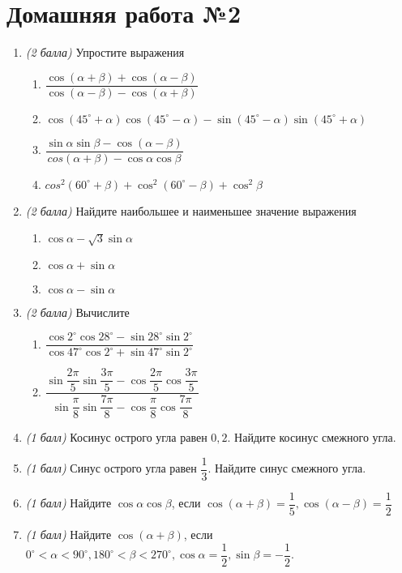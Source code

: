 \documentclass[12pt, a4paper]{article}
\begin{document}
	
	\section*{Домашняя работа №2}
	\begin{enumerate}
		\item \textit{(2 балла)} Упростите выражения
		\begin{enumerate}[label=\asbuk*)]
			\item $\dfrac{\cos (\alpha+\beta)+\cos (\alpha-\beta) }{\cos (\alpha-\beta)-\cos(\alpha+\beta)}$
			\item $\cos(45^{\circ}+\alpha)\cos(45^{\circ}-\alpha)-\sin(45^{\circ}-\alpha)\sin(45^{\circ}+\alpha)$
			\item $\dfrac{\sin\alpha\sin\beta-\cos(\alpha-\beta)}{cos(\alpha+\beta)-\cos\alpha\cos\beta}$
			\item $cos^2(60^{\circ}+\beta)+\cos^2(60^{\circ}-\beta)+\cos^{2}\beta$
		\end{enumerate}
		\item \textit{(2 балла)} Найдите наибольшее и наименьшее значение выражения
		\begin{enumerate}[label=\asbuk*)]
			\item $\cos\alpha-\sqrt{3}\sin\alpha$
			\item $\cos\alpha+\sin\alpha$
			\item $\cos\alpha-\sin\alpha$
		\end{enumerate}
	\item \textit{(2 балла)} Вычислите
		\begin{multicols}{2}
		\begin{enumerate}[label=\asbuk*)]
			\item $\dfrac{\cos2^{\circ}\cos28^{\circ}-\sin28^{\circ}\sin2^{\circ}}{\cos47^{\circ}\cos2^{\circ}+\sin47^{\circ}\sin2^{\circ}}$
			\item $\dfrac{\sin\dfrac{2\pi}{5}\sin\dfrac{3\pi}{5}-\cos\dfrac{2\pi}{5}\cos\dfrac{3\pi}{5}}{\sin\dfrac{\pi}{8}\sin\dfrac{7\pi}{8}-\cos\dfrac{\pi}{8}\cos\dfrac{7\pi}{8}}$
		\end{enumerate}
		\end{multicols}
	\item \textit{(1 балл)} Косинус острого угла равен $0,2$. Найдите косинус смежного угла.
	\item \textit{(1 балл)} Синус острого угла равен $\dfrac{1}{3}$. Найдите синус смежного угла.
	\item \textit{(1 балл)} Найдите $\cos\alpha\cos\beta$, если $\cos(\alpha+\beta)=\dfrac{1}{5}, \cos(\alpha-\beta)=\dfrac{1}{2}$
	\item \textit{(1 балл)} Найдите $\cos(\alpha+\beta)$, если $0^{\circ}<\alpha<90^{\circ}, 180^{\circ}<\beta<270^{\circ}, \cos\alpha=\dfrac{1}{2}, \sin\beta=-\dfrac{1}{2}$.
	
\end{enumerate}
\end{document}
